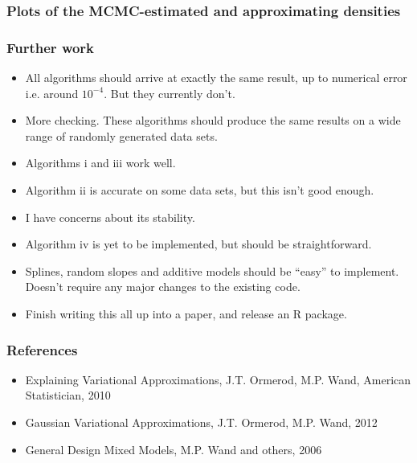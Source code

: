 \documentclass{beamer}
\begin{document}
\begin{frame}
\frametitle{Plots of the MCMC-estimated and approximating densities}
\end{frame}

\begin{frame}
\frametitle{Further work}
\begin{itemize}
\item All algorithms should arrive at exactly the same result, up to numerical error i.e. around $10^{-4}$. But they currently don't.
\item More checking. These algorithms should produce the same results on
a wide range of randomly generated data sets.
\item Algorithms i and iii work well.
\item Algorithm ii is accurate on some data sets, but this isn't good enough.
\item I have concerns about its stability.
\item Algorithm iv is yet to be implemented, but should be straightforward.
\item Splines, random slopes and additive models should be ``easy'' to implement. Doesn't require any major changes to the existing code.
\item Finish writing this all up into a paper, and release an R package.
\end{itemize}
\end{frame}

\begin{frame}
\frametitle{References}
\begin{itemize}
\item Explaining Variational Approximations, J.T. Ormerod, M.P. Wand, American Statistician, 2010
\item Gaussian Variational Approximations, J.T. Ormerod, M.P. Wand, 2012
\item General Design Mixed Models, M.P. Wand and others, 2006
\end{itemize}
\end{frame}
\end{document}
